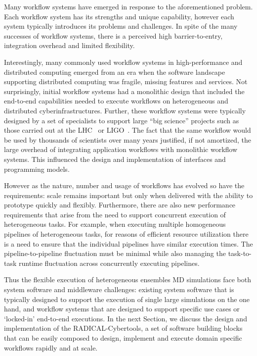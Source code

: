 \documentclass[conference]{IEEEtran}
\begin{document}
Many workflow systems have emerged in response to the aforementioned problem.
Each workflow system has its strengths and unique capability, however each
system typically introduces its problems and challenges. In spite of the many
successes of workflow systems, there is a perceived high barrier-to-entry,
integration overhead and limited flexibility.

Interestingly, many commonly used workflow systems in high-performance and
distributed computing emerged from an era when the software landscape
supporting distributed computing was fragile, missing features and services.
Not surprisingly, initial workflow systems had a monolithic design that
included the end-to-end capabilities needed to execute workflows on
heterogeneous and distributed cyberinfrastructures. Further, these workflow
systems were typically designed by a set of specialists to support large
``big science'' projects such as those carried out at the
LHC~\cite{breskin2009cern} or LIGO~\cite{althouse1992ligo}. The fact that the
same workflow would be used by thousands of scientists over many years
justified, if not amortized, the large overhead of integrating application
workflows with monolithic workflow systems. This influenced the design and
implementation of interfaces and programming models.

However as the nature, number and usage of workflows has evolved so have the
requirements: scale remains important but only when delivered with the
ability to prototype quickly and flexibly. Furthermore, there are also new
performance requirements that arise from the need to support concurrent
execution of heterogeneous tasks. For example, when executing multiple
homogeneous pipelines of heterogeneous tasks, for reasons of efficient
resource utilization there is a need to ensure that the individual pipelines
have similar execution times. The pipeline-to-pipeline fluctuation must be
minimal while also managing the task-to-task runtime fluctuation across
concurrently executing pipelines.


Thus the flexible execution of heterogeneous ensembles MD simulations face
both system software and middleware challenges: existing system software that
is typically designed to support the execution of single large simulations on
the one hand, and workflow systems that are designed to support specific use
cases or `locked-in' end-to-end executions. In the next Section, we discuss
the design and implementation of the RADICAL-Cybertools, a set of software
building blocks that can be easily composed to design, implement and execute
domain specific workflows rapidly and at scale.
\end{document}
